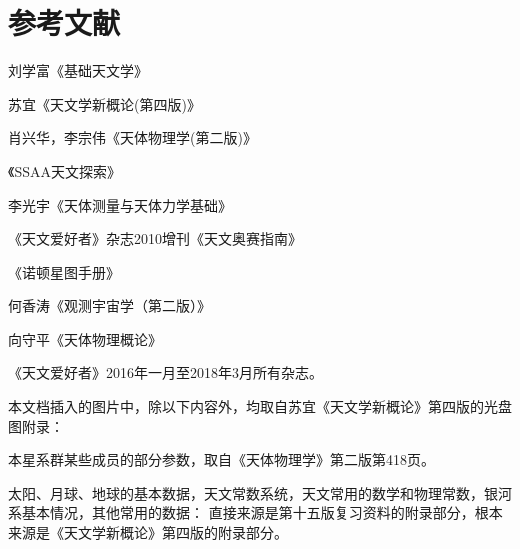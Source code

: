 \chapter{参考文献}
刘学富《基础天文学》

苏宜《天文学新概论(第四版)》

肖兴华，李宗伟《天体物理学(第二版)》

《SSAA天文探索》

李光宇《天体测量与天体力学基础》

《天文爱好者》杂志2010增刊《天文奥赛指南》

《诺顿星图手册》

何香涛《观测宇宙学（第二版）》

向守平《天体物理概论》

《天文爱好者》2016年一月至2018年3月所有杂志。

本文档插入的图片中，除以下内容外，均取自苏宜《天文学新概论》第四版的光盘图附录：

本星系群某些成员的部分参数，取自《天体物理学》第二版第418页。

太阳、月球、地球的基本数据，天文常数系统，天文常用的数学和物理常数，银河系基本情况，其他常用的数据：
直接来源是第十五版复习资料的附录部分，根本来源是《天文学新概论》第四版的附录部分。